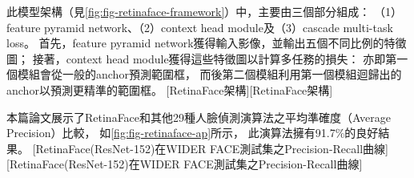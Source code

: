\documentclass[class=NCU_thesis, crop=false]{standalone}
\begin{document}
此模型架構（見\cref{fig:fig-retinaface-framework}）中，主要由三個部分組成：
（1）feature pyramid network、（2）context head module及（3）cascade multi-task loss。
首先，feature pyramid network獲得輸入影像，並輸出五個不同比例的特徵圖；
接著，context head module獲得這些特徵圖以計算多任務的損失：
亦即第一個模組會從一般的anchor預測範圍框，
而後第二個模組利用第一個模組迴歸出的anchor以預測更精準的範圍框。
[RetinaFace架構][RetinaFace架構]

本篇論文展示了RetinaFace和其他29種人臉偵測演算法之平均準確度（Average Precision）比較，
如\cref{fig:fig-retinaface-ap}所示，
此演算法擁有91.7\%的良好結果。
[RetinaFace(ResNet-152)在WIDER FACE測試集之Precision-Recall曲線][RetinaFace(ResNet-152)在WIDER FACE測試集之Precision-Recall曲線]
\end{document}
